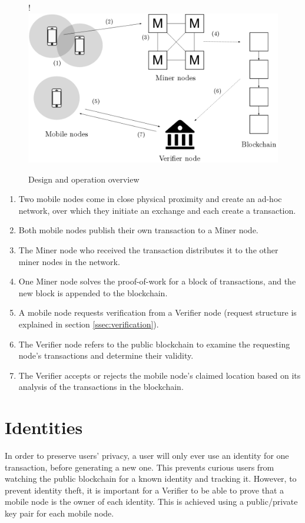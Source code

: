 \begin{figure}[H]
\begin{center}
\resizebox {\columnwidth} {!} {\includegraphics{diagrams/overview.png}}
\caption{Design and operation overview}
\label{fig:overview}
\end{center}
\end{figure}

\vspace{-1cm}
\begin{enumerate}[label=\textbf{\arabic*}.]
\item Two mobile nodes come in close physical proximity and create an ad-hoc network, over which they initiate an exchange and each create a transaction.
\item Both mobile nodes publish their own transaction to a Miner node.
\item The Miner node who received the transaction distributes it to the other miner nodes in the network.
\item One Miner node solves the proof-of-work for a block of transactions, and the new block is appended to the blockchain.
\item A mobile node requests verification from a Verifier node (request structure is explained in section \ref{ssec:verification}).
\item The Verifier node refers to the public blockchain to examine the requesting node's transactions and determine their validity.
\item The Verifier accepts or rejects the  mobile node's claimed location based on its analysis of the transactions in the blockchain. 
\end{enumerate}

\section{Identities} \label{sec:identities}
In order to preserve users' privacy, a user will only ever use an identity for one transaction, before generating a new one. This prevents curious users from watching the public blockchain for a known identity and tracking it. However, to prevent identity theft, it is important for a Verifier to be able to prove that a mobile node is the owner of each identity. This is achieved using a public/private key pair for each mobile node.

